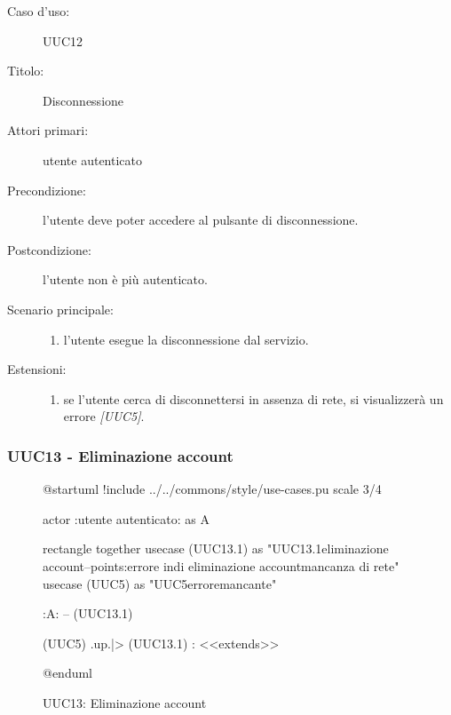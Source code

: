 \documentclass[casi-duso]{subfiles}
\begin{document}
  \begin{description}
  \item[Caso d’uso:] UUC12
  \item[Titolo:] Disconnessione
  \item[Attori primari:] utente autenticato
  \item[Precondizione:] l'utente deve poter accedere al pulsante di disconnessione.
  \item[Postcondizione:] l'utente non è più autenticato.
  \item[Scenario principale:]
        \begin{enumerate}
          \item l'utente esegue la disconnessione dal servizio.
        \end{enumerate}
  \item[Estensioni:]
        \begin{enumerate}
          \item se l'utente cerca di disconnettersi in assenza di rete, si visualizzerà un errore \emph{[UUC5]}.
        \end{enumerate}
\end{description}

\subsubsection{UUC13 - Eliminazione account}%
\label{subsub:UUC13utente}

\begin{figure}[h!]
  \centering
  \begin{plantuml}
  @startuml
  !include ../../commons/style/use-cases.pu
  scale 3/4

  actor :utente autenticato: as A

  rectangle {
    together {
      usecase (UUC13.1) as "UUC13.1\nConferma eliminazione account\n--\nExtension points:\nVisualizzazione errore in\ncaso di eliminazione account\nin mancanza di rete"
      usecase (UUC5) as "UUC5\nVisualizzazione errore\nrete mancante"
    }
  }

  :A: -- (UUC13.1)

  (UUC5) .up.|> (UUC13.1) : <<extends>>

  @enduml
  \end{plantuml}
  \caption{UUC13: Eliminazione account}
  \label{fig:uuc13}
\end{figure}
\end{document}
